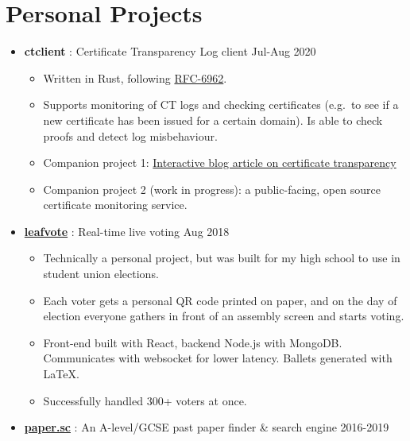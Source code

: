   \section{Personal Projects}

  \begin{itemize}

    \item \textbf{ctclient} : Certificate Transparency Log client \dashdiv{} Jul-Aug 2020

    \begin{itemize}
      \item Written in Rust, following \href{https://tools.ietf.org/html/rfc6962}{\color{link}RFC-6962}.
      \item Supports monitoring of CT logs and checking certificates (e.g.\ to see if a new certificate has been issued for a certain domain). Is able to check proofs and detect log misbehaviour.
      \item Companion project 1: \href{https://blog.maowtm.org/ct/en.html}{\color{link}Interactive blog article on certificate transparency}
      \item Companion project 2 (work in progress): a public-facing, open source certificate monitoring service.
    \end{itemize}

    \item \href{https://leafvote.mww.moe}{\color{link}\textbf{leafvote}} : Real-time live voting \dashdiv{} Aug 2018

    \begin{itemize}
      \item Technically a personal project, but was built for my high school to use in student union elections.
      \item Each voter gets a personal QR code printed on paper, and on the day of election everyone gathers in front of an assembly screen and starts voting.
      \item Front-end built with React, backend Node.js with MongoDB. Communicates with websocket for lower latency. Ballets generated with \LaTeX.
      \item Successfully handled 300+ voters at once.
    \end{itemize}

    \item \href{https://paper.sc}{\color{link}\textbf{paper.sc}} : An A-level/GCSE past paper finder \& search engine \dashdiv{} 2016-2019


\end{itemize}
